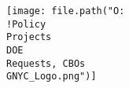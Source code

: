 \documentclass{article}
\begin{document}


\texttt{[image: 
file.path("O:\\!Policy\\Projects\\DOE\\Requests, CBOs\\GNYC\_Logo.png")]}
\end{document}
